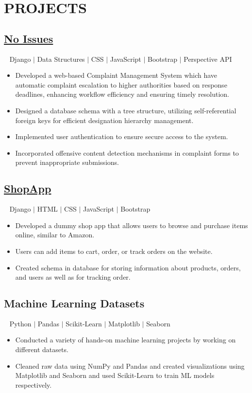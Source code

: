 \documentclass[12pt]{article}
\begin{document}
\section*{PROJECTS}
\subsection*{\href{https://github.com/Akanksha2403/no_issues}{No Issues}}~ Django $\vert$ Data Structures $\vert$ CSS $\vert$ JavaScript $\vert$ Bootstrap $\vert$ Perspective API\\
\begin{itemize}[leftmargin=20px, topsep=1pt, itemsep=1.5pt, partopsep=1pt, parsep=1pt]
  \item Developed a web-based Complaint Management System which have automatic complaint escalation to higher authorities based on response deadlines, enhancing workflow efficiency and ensuring timely resolution.
  \item Designed a database schema with a tree structure, utilizing self-referential foreign keys for efficient designation hierarchy management.
  \item Implemented user authentication to ensure secure access to the system.
  \item Incorporated offensive content detection mechanisms in complaint forms to prevent inappropriate submissions.
\end{itemize}

\subsection*{\href{https://akanksha2403.pythonanywhere.com/}{ShopApp}}~ Django $\vert$ HTML $\vert$ CSS $\vert$ JavaScript $\vert$ Bootstrap \\
\begin{itemize}[leftmargin=20px, topsep=0.5pt, itemsep=1.5pt, partopsep=0.5pt, parsep=0.5pt]
  \item Developed a dummy shop app that allows users to browse and purchase items online, similar to Amazon.
  \item Users can add items to cart, order, or track orders on the website.
  \item Created schema in database for storing information about products, orders, and users as well as for tracking order.
\end{itemize}
\subsection*{Machine Learning Datasets}~ Python $\vert$ Pandas $\vert$ Scikit-Learn $\vert$ Matplotlib $\vert$ Seaborn \\
\begin{itemize}[leftmargin=20px, topsep=0.5pt, itemsep=1.5pt, partopsep=0.5pt, parsep=0.5pt]
    \item Conducted a variety of hands-on machine learning projects by working on different datasets.
    \item Cleaned raw data using NumPy and Pandas and created visualizations using Matplotlib and Seaborn and used Scikit-Learn to train ML models respectively.
\end{itemize}
\end{document}
